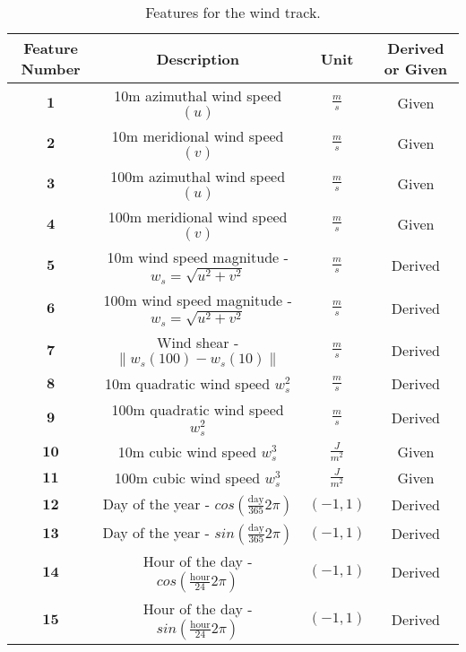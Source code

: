 \documentclass{article}
\begin{document}
\begin{table}[H]
  \centering
  \caption{Features for the wind track.}
  \label{}
  \begin{adjustbox}{width=1\textwidth}
  \begin{tabular}{|c|c|c|c|}
    \hline
     Feature Number & Description & Unit & Derived or Given \\
    \hline
    $\textbf{1}$ & 10m azimuthal wind speed $(u)$ & $\frac{m}{s}$ & Given \\
    \hline
    $\textbf{2}$ & 10m meridional wind speed $(v)$ & $\frac{m}{s}$ & Given \\
    \hline
    $\textbf{3}$ & 100m azimuthal wind speed $(u)$ & $\frac{m}{s}$ & Given \\
    \hline
    $\textbf{4}$ & 100m meridional wind speed $(v)$ & $\frac{m}{s}$ & Given \\
    \hline
    $\textbf{5}$ & 10m wind speed magnitude - $w_s = \sqrt{u^2 + v^2}$ & $\frac{m}{s}$ & Derived \\
    \hline
    $\textbf{6}$ & 100m wind speed magnitude - $w_s = \sqrt{u^2 + v^2}$ & $\frac{m}{s}$ & Derived \\
    \hline
    $\textbf{7}$ & Wind shear - $\|w_s(100) - w_s(10)\|$ & $\frac{m}{s}$ & Derived \\
    \hline
    $\textbf{8}$ & 10m quadratic wind speed $w_s^2$ & $\frac{m}{s}$ & Derived \\
    \hline
    $\textbf{9}$ & 100m quadratic wind speed $w_s^2$ & $\frac{m}{s}$ & Derived \\
    \hline
    $\textbf{10}$ & 10m cubic wind speed $w_s^3$ & $\frac{J}{m^2}$ & Given \\
    \hline
    $\textbf{11}$ & 100m cubic wind speed $w_s^3$ & $\frac{J}{m^2}$ & Given \\
    \hline
    $\textbf{12}$ & Day of the year - $cos(\frac{\text{day}}{365}2\pi)$ & $(-1,1)$ & Derived \\
    \hline
    $\textbf{13}$ & Day of the year - $sin(\frac{\text{day}}{365}2\pi)$ & $(-1,1)$ & Derived \\
    \hline
    $\textbf{14}$ & Hour of the day - $cos(\frac{\text{hour}}{24}2\pi)$ & $(-1,1)$ & Derived \\
    \hline
    $\textbf{15}$ & Hour of the day - $sin(\frac{\text{hour}}{24}2\pi)$ & $(-1,1)$ & Derived \\
    \hline
  \end{tabular}
  \end{adjustbox}
\end{table}
\end{document}
